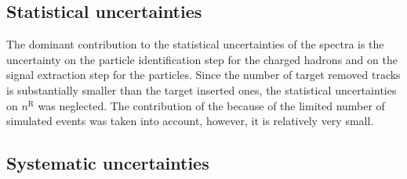 \subsection{Statistical uncertainties}
\label{sec:hadron:spec:stat}

The dominant contribution to the statistical uncertainties
of the spectra is the uncertainty on the particle identification
step for the charged hadrons and on the signal extraction step
for the \vzero particles.
Since the number of target removed tracks is substantially
smaller than the target inserted ones,  
the statistical uncertainties on $n^\text{R}$ was neglected.
The contribution of the \cmc because of the limited number of
simulated events was taken into account, however, it
is relatively very small. 


\subsection{Systematic uncertainties}
\label{sec:hadron:spec:syst}

